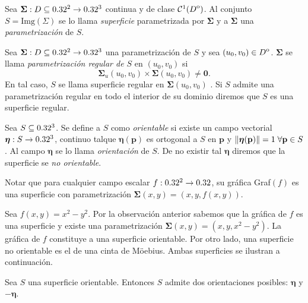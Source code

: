 \begin{definition} Sea  $\boldsymbol{\Sigma}:D \subseteq0.32^2 \to0.32^3$ continua y de clase $\mathcal{C}^1({\kern0ptD}^{\mathrm{o}})$.  Al conjunto  $S = \text{Img}(\Sigma)$ se lo llama  \emph{superficie}   parametrizada por  $\boldsymbol{\Sigma}$  y   
   a  $\boldsymbol{\Sigma}$  una \emph{parametrizaci\'on} de $S$.
\end{definition}

\begin{definition}
    Sea $\boldsymbol{\Sigma}:D\subseteq0.32^2 \to0.32^3$ una parametrizaci\'on de $S$ y sea $(u_0, v_0) \in {\kern0ptD}^{\mathrm{o}}$.   $\boldsymbol{\Sigma}$ se llama  \emph{parametrizaci\'on regular de $S$} en  $(u_0, v_0)$ si
    \[
        \boldsymbol{\Sigma}_u(u_0,v_0)\times\boldsymbol{\Sigma}(u_0,v_0)\neq \boldsymbol{0}.
    \]
    En tal caso, $S$ se llama superficie regular en $\boldsymbol{\Sigma}(u_0,v_0)$ . Si $S$   admite una parametrizaci\'on regular en todo el interior de su dominio diremos que  $S$ es una superficie regular.
\end{definition}

\begin{definition}
    Sea $S\subseteq0.32^3$. Se define a $S$ como \emph{orientable} si existe un campo vectorial $\boldsymbol{\eta}:S\to0.32^3$, continuo talque $\boldsymbol{\eta}(\mathbf{p})$ es ortogonal a $S$ en $\mathbf{p}$ y $\norm{\boldsymbol{\eta}(\mathbf{p})}=1\;\forall \mathbf{p}\in S$. Al campo $\boldsymbol{\eta}$ se lo llama \emph{orientaci\'on} de $S$. De no existir tal $\boldsymbol{\eta}$ diremos que la superficie se \emph{no orientable}.
\end{definition}


\begin{obs} Notar que para cualquier campo escalar $f:0.32^2\to0.32$, su gr\'afica Graf$(f)$ es una superficie con parametrización $\boldsymbol{\Sigma}(x,y)=(x,y,f(x,y))$.
\end{obs}


\begin{example} Sea $f(x,y) = x^2-y^2$. Por la observaci\'on anterior sabemos que la gr\'afica de $f$ es una superficie y existe una parametrización $\boldsymbol{\Sigma}(x,y)=(x,y,x^2-y^2)$. La gr\'afica de $f$ constituye a una superficie orientable. Por otro lado, una superficie no orientable es el de una cinta de Möebius. Ambas superficies se ilustran a continuaci\'on.

\end{example}

\begin{obs}
    Sea $S$ una superficie orientable. Entonces $S$ admite dos orientaciones posibles: $\boldsymbol{\eta}$ y $-\boldsymbol{\eta}$.
\end{obs}

